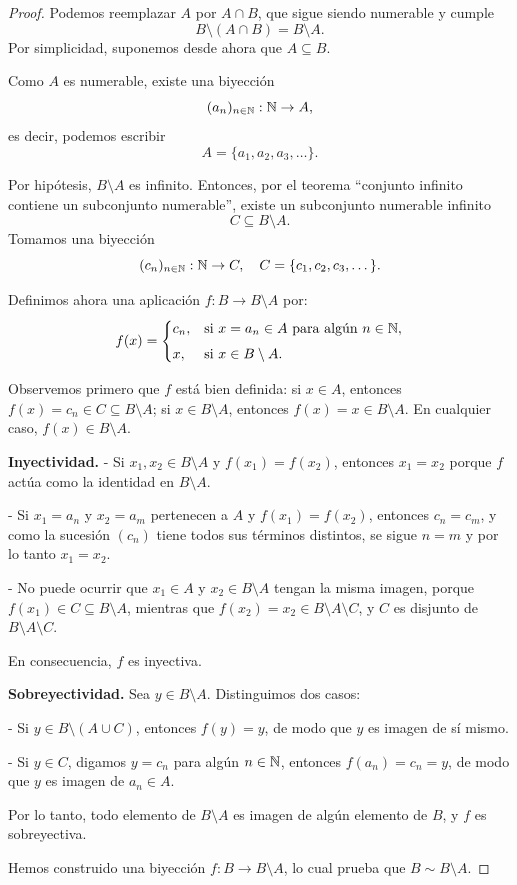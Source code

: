 \begin{proof}
Podemos reemplazar $A$ por $A \cap B$, que sigue siendo numerable y
cumple
\[
B \setminus (A \cap B) = B \setminus A.
\]
Por simplicidad, suponemos desde ahora que $A \subseteq B$.

Como $A$ es numerable, existe una biyección
\[
(a_n)_{n\in\mathbb{N}} : \mathbb{N} \to A,
\]
es decir, podemos escribir
\[
A = \{a_1, a_2, a_3,\dots\}.
\]

Por hipótesis, $B \setminus A$ es infinito. Entonces, por el teorema
“conjunto infinito contiene un subconjunto numerable”, existe un
subconjunto numerable infinito
\[
C \subseteq B \setminus A.
\]
Tomamos una biyección
\[
(c_n)_{n\in\mathbb{N}} : \mathbb{N} \to C, \quad C = \{c_1, c_2, c_3,\dots\}.
\]

Definimos ahora una aplicación $f : B \to B \setminus A$ por:
\[
f(x) =
\begin{cases}
c_n, & \text{si } x = a_n \in A \text{ para algún } n \in \mathbb{N},\\[4pt]
x,   & \text{si } x \in B \setminus A.
\end{cases}
\]

Observemos primero que $f$ está bien definida: si $x \in A$, entonces
$f(x) = c_n \in C \subseteq B \setminus A$; si $x \in B \setminus A$,
entonces $f(x) = x \in B \setminus A$. En cualquier caso,
$f(x) \in B \setminus A$.

\medskip

\noindent\textbf{Inyectividad.}
- Si $x_1, x_2 \in B \setminus A$ y $f(x_1) = f(x_2)$, entonces
  $x_1 = x_2$ porque $f$ actúa como la identidad en $B \setminus A$.

- Si $x_1 = a_n$ y $x_2 = a_m$ pertenecen a $A$ y
  $f(x_1) = f(x_2)$, entonces $c_n = c_m$, y como la sucesión
  $(c_n)$ tiene todos sus términos distintos, se sigue $n = m$ y
  por lo tanto $x_1 = x_2$.

- No puede ocurrir que $x_1 \in A$ y $x_2 \in B \setminus A$ tengan
  la misma imagen, porque $f(x_1) \in C \subseteq B \setminus A$,
  mientras que $f(x_2) = x_2 \in B \setminus A \setminus C$, y
  $C$ es disjunto de $B \setminus A \setminus C$.

En consecuencia, $f$ es inyectiva.

\medskip

\noindent\textbf{Sobreyectividad.}
Sea $y \in B \setminus A$. Distinguimos dos casos:

- Si $y \in B \setminus (A \cup C)$, entonces $f(y) = y$, de modo que
  $y$ es imagen de sí mismo.

- Si $y \in C$, digamos $y = c_n$ para algún $n \in \mathbb{N}$, entonces
  $f(a_n) = c_n = y$, de modo que $y$ es imagen de $a_n \in A$.

Por lo tanto, todo elemento de $B \setminus A$ es imagen de algún
elemento de $B$, y $f$ es sobreyectiva.

\medskip

Hemos construido una biyección $f : B \to B \setminus A$, lo cual prueba
que $B \sim B \setminus A$.
\end{proof}

